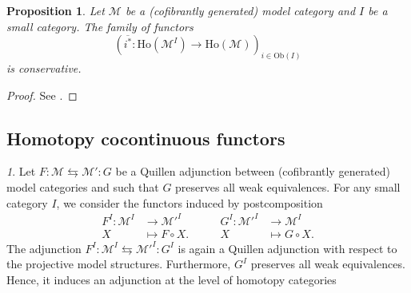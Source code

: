 \documentclass[reqno]{amsart}
\theoremstyle{plain}
\newtheorem{proposition}[subsubsection]{Proposition}
\theoremstyle{definition}
\theoremstyle{remark}
\newtheorem{paragr}[subsubsection]{} %
\newcommand{\M}{\mathcal{M}}
\newcommand{\fun}[2]{{#2}^{#1}} %
\newcommand{\Ob}{\mathrm{Ob}} %
\newcommand{\Loc}[1]{\mathrm{Ho}(#1)} %
\newcommand{\GZ}[1]{\overline{#1}} %
\begin{document}
\begin{proposition}\label{prop:der2} Let $\M$ be a (cofibrantly generated) model
category and $I$ be a small category. The family of functors
  \[ \left(\GZ{i^*} \colon \Loc{\fun{I}{\M}}\to \Loc{\M}\right)_{i \in
\Ob(I)}
  \] is conservative.
\end{proposition}
\begin{proof}
  See \cite[Lemme 2.4]{cisinski:images}.
\end{proof}
\subsection{Homotopy cocontinuous functors}\label{hptycocts}
\begin{paragr}\label{paragr:univmor} Let $F \colon \M \leftrightarrows \M' \colon G$ be a
  Quillen adjunction between (cofibrantly generated) model categories
  and such that $G$ preserves all weak equivalences. For any small
category $I$, we consider the functors induced by postcomposition
  \[\begin{aligned} \fun{I}{F} \colon \fun{I}{\M} &\to \fun{I}{\M'}\\ X &\mapsto
F\circ X.
  \end{aligned} \quad \quad \begin{aligned} \fun{I}{G} \colon \fun{I}{\M'} &\to \fun{I}{\M}\\ X &\mapsto
G\circ X.
  \end{aligned}\]
The adjunction $\fun{I}{F} \colon \fun{I}{\M} \leftrightarrows
\fun{I}{\M'} \colon \fun{I}{G}$ is again a Quillen adjunction with
respect to the projective model structures. Furthermore, $\fun{I}{G}$
preserves all weak equivalences. Hence, it induces an adjunction at
the level of homotopy categories


\end{paragr}
\end{document}
